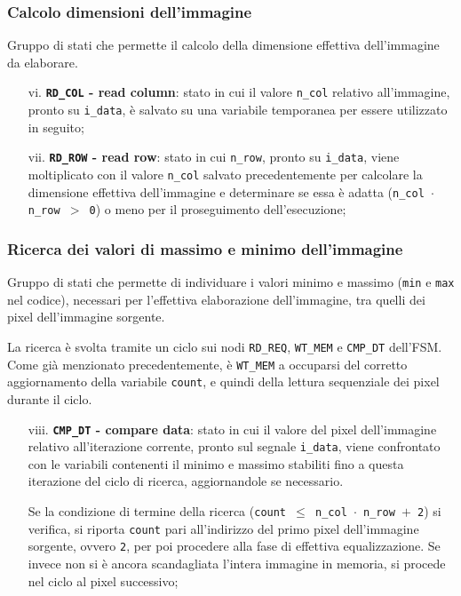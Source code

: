 \documentclass{article}
\begin{document}
\subsubsection{Calcolo dimensioni dell'immagine} %
Gruppo di stati che permette il calcolo della dimensione effettiva dell’immagine da elaborare.

\begin{itemize}
    \item [vi.]     \textbf{\texttt{RD\_COL} - read column}: stato in cui il valore \texttt{n\_col} relativo all’immagine, pronto su \texttt{i\_data}, è salvato su una variabile temporanea per essere utilizzato in seguito;
    \item [vii.]    \textbf{\texttt{RD\_ROW} - read row}: stato in cui \texttt{n\_row}, pronto su \texttt{i\_data}, viene moltiplicato con il valore \texttt{n\_col} salvato precedentemente per calcolare la dimensione effettiva dell’immagine e determinare se essa è adatta (\texttt{n\_col $\cdot$ n\_row $>$ 0}) o meno per il proseguimento dell’esecuzione;
\end{itemize}

\subsubsection{Ricerca dei valori di massimo e minimo dell'immagine} %
Gruppo di stati che permette di individuare i valori minimo e massimo (\texttt{min} e \texttt{max} nel codice), necessari per l’effettiva elaborazione dell’immagine, tra quelli dei pixel dell’immagine sorgente.\par
La ricerca è svolta tramite un ciclo sui nodi \texttt{RD\_REQ}, \texttt{WT\_MEM} e \texttt{CMP\_DT} dell’FSM. Come già menzionato precedentemente, è \texttt{WT\_MEM} a occuparsi del corretto aggiornamento della variabile \texttt{count}, e quindi della lettura sequenziale dei pixel durante il ciclo.\par

\begin{itemize}
    \item [viii.]   \textbf{\texttt{CMP\_DT} - compare data}: stato in cui il valore del pixel dell’immagine relativo all’iterazione corrente, pronto sul segnale \texttt{i\_data}, viene confrontato con le variabili contenenti il minimo e massimo stabiliti fino a questa iterazione del ciclo di ricerca, aggiornandole se necessario.\par
                    Se la condizione di termine della ricerca (\texttt{count $\leq$ n\_col $\cdot$ n\_row $+$ 2}) si verifica, si riporta \texttt{count} pari all’indirizzo del primo pixel dell’immagine sorgente, ovvero \texttt{2}, per poi procedere alla fase di effettiva equalizzazione. Se invece non si è ancora scandagliata l’intera immagine in memoria, si procede nel ciclo al pixel successivo;
\end{itemize}
\end{document}
